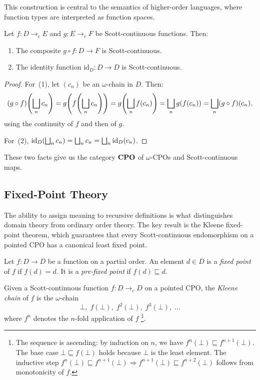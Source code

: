 This construction is central to the semantics of higher-order
languages, where function types are interpreted as function spaces.

\begin{proposition}
\label{prop:cont-compose}
Let $f : D \to_{c} E$ and $g : E \to_{c} F$ be Scott-continuous
functions. Then:
\begin{enumerate}
  \item The composite $g \circ f : D \to F$ is Scott-continuous.
  \item The identity function $\mathrm{id}_D : D \to D$ is
        Scott-continuous.
\end{enumerate}
\end{proposition}

\begin{proof}
For~(1), let $(c_n)$ be an $\omega$-chain in $D$. Then:
\[
  (g \circ f)\!\left(\bigsqcup_n c_n\right)
    = g\!\left(f\!\left(\bigsqcup_n c_n\right)\right)
    = g\!\left(\bigsqcup_n f(c_n)\right)
    = \bigsqcup_n g(f(c_n))
    = \bigsqcup_n (g \circ f)(c_n),
\]
using the continuity of $f$ and then of $g$.

For~(2),
$\mathrm{id}_D(\bigsqcup_n c_n) = \bigsqcup_n c_n
  = \bigsqcup_n \mathrm{id}_D(c_n)$.
\end{proof}

These two facts give us the category $\mathbf{CPO}$ of $\omega$-CPOs and
Scott-continuous maps.

\subsection{Fixed-Point Theory}
\label{sec:bg-fixedpoints}

The ability to assign meaning to recursive definitions is what distinguishes
domain theory from ordinary order theory. The key result is the Kleene
fixed-point theorem, which guarantees that every Scott-continuous
endomorphism on a pointed CPO has a canonical least fixed point.

\begin{definition}
\label{def:fixed-point}
Let $f : D \to D$ be a function on a partial order. An element $d \in D$ is
a \emph{fixed point} of $f$ if $f(d) = d$. It is a \emph{pre-fixed point}
if $f(d) \sqsubseteq d$.
\end{definition}

\begin{definition}
\label{def:kleene-chain}
Given a Scott-continuous function $f : D \to_{c} D$ on a pointed CPO, the
\emph{Kleene chain} of $f$ is the $\omega$-chain
\[
  \bot,\; f(\bot),\; f^2(\bot),\; f^3(\bot),\; \ldots
\]
where $f^n$ denotes the $n$-fold application of $f$%
\footnote{The sequence is ascending: by induction on $n$, we have
$f^n(\bot) \sqsubseteq f^{n+1}(\bot)$. The base case $\bot \sqsubseteq
f(\bot)$ holds because $\bot$ is the least element. The inductive step
$f^n(\bot) \sqsubseteq f^{n+1}(\bot) \Rightarrow f^{n+1}(\bot)
\sqsubseteq f^{n+2}(\bot)$ follows from monotonicity of $f$.}.
\end{definition}


